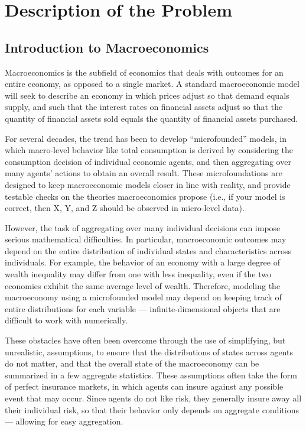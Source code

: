 \documentclass[a4paper,12pt]{article}
\numberwithin{equation}{section}
\theoremstyle{definition}
\begin{document}
\small

\setlength\voffset{-0.75 in}

\changepage{1.5 in}{1 in}{0 in}{-0.5 in}{0 in}{0 in}{0 in}{0 in}{0 in}


\section{Description of the Problem}

\subsection{Introduction to Macroeconomics}

Macroeconomics is the subfield of economics that deals with outcomes
for an entire economy, as opposed to a single market. A standard
macroeconomic model will seek to describe an economy in which prices
adjust so that demand equals supply, and such that the interest rates
on financial assets adjust so that the quantity of financial assets
sold equals the quantity of financial assets purchased.

For several decades, the trend has been to develop ``microfounded''
models, in which macro-level behavior like total consumption is
derived by considering the consumption decision of individual economic
agents, and then aggregating over many agents' actions to obtain an
overall result. These microfoundations are designed to keep
macroeconomic models closer in line with reality, and provide testable
checks on the theories macroeconomics propose (i.e., if your model is
correct, then X, Y, and Z should be observed in micro-level data).

However, the task of aggregating over many individual decisions can
impose serious mathematical difficulties. In particular, macroeconomic
outcomes may depend on the entire distribution of individual states
and characteristics across individuals. For example, the behavior of
an economy with a large degree of wealth inequality may differ from
one with less inequality, even if the two economies exhibit the same
average level of wealth. Therefore, modeling the macroeconomy using a
microfounded model may depend on keeping track of entire distributions
for each variable --- infinite-dimensional objects that are difficult
to work with numerically.

These obstacles have often been overcome through the use of
simplifying, but unrealistic, assumptions, to ensure that the
distributions of states across agents do not matter, and that the
overall state of the macroeconomy can be summarized in a few aggregate
statistics. These assumptions often take the form of perfect insurance
markets, in which agents can insure against any possible event that
may occur. Since agents do not like risk, they generally insure away
all their individual risk, so that their behavior only depends on
aggregate conditions --- allowing for easy aggregation.
\end{document}
